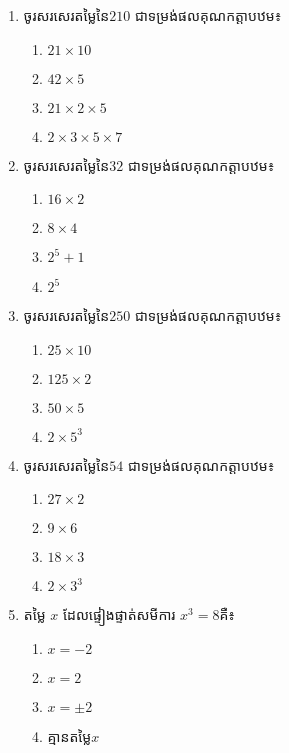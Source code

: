 \begin{enumerate}
\item ចូរសរសេរតម្លៃនៃ$210$ ជាទម្រង់ផលគុណកត្តាបឋម៖
\begin{multicols}{4}
\begin{enumerate}[label=\alph*.]
	\item $21\times 10$
	\item $42 \times 5$
	\item $21\times 2\times 5$
	\item $2\times 3\times 5\times 7$
\end{enumerate}
\end{multicols}

\item ចូរសរសេរតម្លៃនៃ$32$ ជាទម្រង់ផលគុណកត្តាបឋម៖
\begin{multicols}{4}
\begin{enumerate}[label=\alph*.]
	\item $16\times 2$
	\item $8 \times 4$
	\item $2^5+1$
	\item $2^5$
\end{enumerate}
\end{multicols}
\item ចូរសរសេរតម្លៃនៃ$250$ ជាទម្រង់ផលគុណកត្តាបឋម៖
\begin{multicols}{4}
\begin{enumerate}[label=\alph*.]
	\item $25\times 10$
	\item $125\times 2$
	\item $50\times 5$
	\item $2\times 5^3$
\end{enumerate}
\end{multicols}
\item ចូរសរសេរតម្លៃនៃ$54$ ជាទម្រង់ផលគុណកត្តាបឋម៖
\begin{multicols}{4}
\begin{enumerate}[label=\alph*.]
	\item $27\times 2$
	\item $9\times 6$
	\item $18\times 3$
	\item $2\times 3^3$
\end{enumerate}
\end{multicols}

\item តម្លៃ $x$ ដែលផ្ទៀងផ្ទាត់សមីការ $x^3=8$គឺ៖
\begin{multicols}{4}
\begin{enumerate}[label=\alph*.]
	\item $x=-2$
	\item $x=2$
	\item $x=\pm 2$
	\item គ្មានតម្លៃ$x$
\end{enumerate}
\end{multicols}


\end{enumerate}
